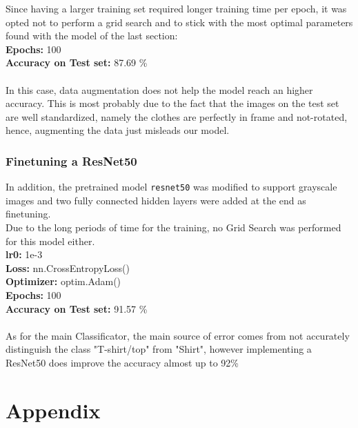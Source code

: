 \documentclass[11pt,a4paper,twocolumn]{IEEEtran}
\newcommand{\thinnersepline}{\noindent\makebox[\linewidth]{\rule{7.5cm}{0.01pt}}}
\begin{document}
			Since having a larger training set required longer training time per epoch, it was opted not to perform a grid search and to stick with the most optimal parameters found with the model of the last section:
			\thinnersepline\\
			\textbf{Epochs:} 100\\
			\textbf{Accuracy on Test set:} 87.69 \%\vspace*{-.2cm}\\
			\thinnersepline\\
			In this case, data augmentation does not help the model reach an higher accuracy. This is most probably due to the fact that the images on the test set are well standardized, namely the clothes are perfectly in frame and not-rotated, hence, augmenting the data just misleads our model. \medskip\\
			\subsubsection{Finetuning a ResNet50}
			In addition, the pretrained model \texttt{resnet50} was modified to support grayscale images and two fully connected hidden layers were added at the end as finetuning.\\
			Due to the long periods of time for the training, no Grid Search was performed for this model either.
			\thinnersepline\\
			\textbf{lr0:} 1e-3\\
			\textbf{Loss:} nn.CrossEntropyLoss()\\
			\textbf{Optimizer:} optim.Adam() \\
			\textbf{Epochs:} 100 \\
			\textbf{Accuracy on Test set:} 91.57 \%\vspace*{-.2cm}\\
			\thinnersepline\\
			As for the main Classificator, the main source of error comes from not accurately distinguish the class "T-shirt/top" from "Shirt", however implementing a ResNet50 does improve the accuracy almost up to 92\%
	\printbibliography
	
	\onecolumn
	\section{\textbf{Appendix}}
\end{document}
